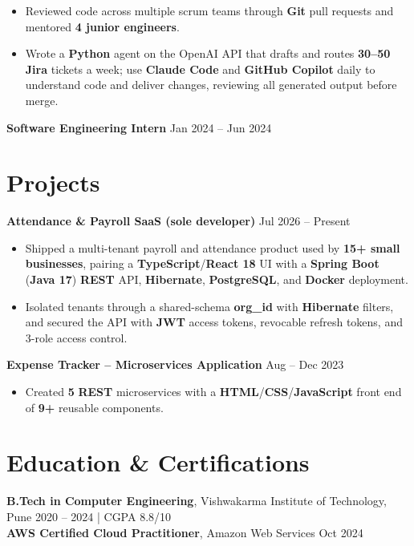\documentclass[a4paper,10pt]{article}
\begin{document}
\begin{itemize}[leftmargin=*]
    \item Reviewed code across multiple scrum teams through \textbf{Git} pull requests and mentored \textbf{4 junior engineers}.
    \item Wrote a \textbf{Python} agent on the OpenAI API that drafts and routes \textbf{30--50 Jira} tickets a week; use \textbf{Claude Code} and \textbf{GitHub Copilot} daily to understand code and deliver changes, reviewing all generated output before merge.
\end{itemize}

\textbf{Software Engineering Intern} \hfill Jan 2024 -- Jun 2024

\section*{Projects}

\textbf{Attendance \& Payroll SaaS (sole developer)} \hfill Jul 2026 -- Present
\begin{itemize}[leftmargin=*]
    \item Shipped a multi-tenant payroll and attendance product used by \textbf{15+ small businesses}, pairing a \textbf{TypeScript}/\textbf{React 18} UI with a \textbf{Spring Boot} (\textbf{Java 17}) \textbf{REST} API, \textbf{Hibernate}, \textbf{PostgreSQL}, and \textbf{Docker} deployment.
    \item Isolated tenants through a shared-schema \textbf{org\_id} with \textbf{Hibernate} filters, and secured the API with \textbf{JWT} access tokens, revocable refresh tokens, and 3-role access control.
\end{itemize}

\noindent\textbf{Expense Tracker -- Microservices Application} \hfill Aug -- Dec 2023
\begin{itemize}[leftmargin=*]
    \item Created \textbf{5} \textbf{REST} microservices with a \textbf{HTML}/\textbf{CSS}/\textbf{JavaScript} front end of \textbf{9+} reusable components.
\end{itemize}

\section*{Education \& Certifications}
\textbf{B.Tech in Computer Engineering}, Vishwakarma Institute of Technology, Pune \hfill 2020 -- 2024 \;|\; CGPA 8.8/10 \\
\textbf{AWS Certified Cloud Practitioner}, Amazon Web Services \hfill Oct 2024
\end{document}
